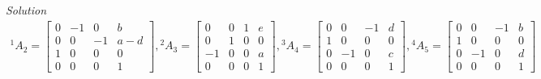 \documentclass{article}
\numberwithin{prob}{section}
\newenvironment{solution}{\emph{Solution}}{}
\begin{document}
\begin{solution}
\begin{align}
  {}^1A_2 = \begin{bmatrix}
    0 & -1 &  0 & b \\
    0 &  0 & -1 & a-d\\
    1 &  0 &  0 & 0\\
    0 &  0 &  0 & 1
  \end{bmatrix}
  ,
  {}^2A_3 = \begin{bmatrix}
     0 & 0 &  1 & e\\
     0 & 1 &  0 & 0\\
     -1 & 0 & 0 & a\\
     0 & 0 &  0 & 1
  \end{bmatrix}
  ,
  {}^3A_4 = \begin{bmatrix}
     0 &  0 & -1 & d\\
     1 &  0 &  0 & 0\\
     0 & -1 &  0 & c\\
     0 & 0 &  0  & 1
  \end{bmatrix}
  ,
  {}^4A_5 = \begin{bmatrix}
     0 &  0 & -1 & b\\
     1 &  0 &  0 & 0\\
     0 & -1 &  0 & d\\
     0 &  0 &  0 & 1
  \end{bmatrix}
\end{align}
\end{solution}
\end{document}
